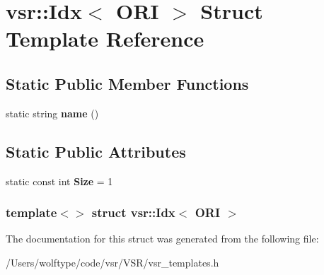 \hypertarget{structvsr_1_1_idx_3_01_o_r_i_01_4}{\section{vsr\-:\-:Idx$<$ O\-R\-I $>$ Struct Template Reference}
\label{structvsr_1_1_idx_3_01_o_r_i_01_4}
}
\subsection*{Static Public Member Functions}
\begin{DoxyCompactItemize}
\item 
\hypertarget{structvsr_1_1_idx_3_01_o_r_i_01_4_a54d36cd356d91c0cb896d58c2760e7ed}{static string {\bfseries name} ()}\label{structvsr_1_1_idx_3_01_o_r_i_01_4_a54d36cd356d91c0cb896d58c2760e7ed}

\end{DoxyCompactItemize}
\subsection*{Static Public Attributes}
\begin{DoxyCompactItemize}
\item 
\hypertarget{structvsr_1_1_idx_3_01_o_r_i_01_4_a8052144e7bc53fd350423c6b6b46aff9}{static const int {\bfseries Size} = 1}\label{structvsr_1_1_idx_3_01_o_r_i_01_4_a8052144e7bc53fd350423c6b6b46aff9}

\end{DoxyCompactItemize}
\subsubsection*{template$<$$>$ struct vsr\-::\-Idx$<$ O\-R\-I $>$}



The documentation for this struct was generated from the following file\-:\begin{DoxyCompactItemize}
\item 
/\-Users/wolftype/code/vsr/\-V\-S\-R/vsr\-\_\-templates.\-h\end{DoxyCompactItemize}
